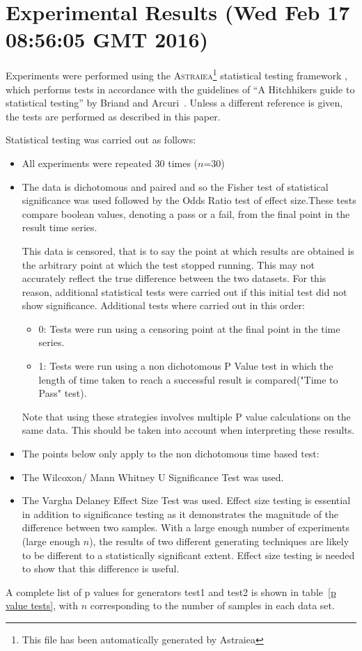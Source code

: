 \documentclass[]{article}
\begin{document}
\section{Experimental Results (Wed Feb 17 08:56:05 GMT 2016)}
Experiments were performed using the \textsc{Astraiea}\footnote{This file has been automatically generated by Astraiea} statistical testing framework \cite{Neumann:2014:EET:2598394.2609850},
which performs tests in accordance with the guidelines of ``A Hitchhikers guide to statistical testing''
by Briand and Arcuri~\cite{Arcuri2012}.
Unless a different reference is given, the tests are performed as described in this paper.



Statistical testing was carried out as follows: 
\begin{itemize}
\item{All experiments were repeated 30 times ($n$=30)}
\item{The data is dichotomous and paired and so the Fisher test of statistical significance was used followed by the Odds Ratio test of effect size.These tests compare boolean values, denoting a pass or a fail, from the final point in the result time series. 

This data is censored, that is to say the point at which results are obtained is the arbitrary point at which the test stopped running. This may not accurately reflect the true difference between the two datasets. For this reason, additional statistical tests were carried out if this initial test did not show significance. Additional tests where carried out in this order:
\begin{itemize}
\item{0: Tests were run using a censoring point at the final point in the time series.}
\item{1: Tests were run using a non dichotomous P Value test in which the length of time taken to reach a successful result is compared("Time to Pass" test).}
\end{itemize}Note that using these strategies involves multiple P value calculations on the same data. This should be taken into account when interpreting these results.
}
\item{The points below only apply to the non dichotomous time based test:}
\item{The Wilcoxon/ Mann Whitney U Significance Test was used.}
\item{The Vargha Delaney Effect Size Test was used. Effect size testing is essential in addition to significance testing as it demonstrates the magnitude of the difference between two samples. With a large enough number of experiments (large enough $n$), the results of two different generating techniques are likely to be different to a statistically significant extent. Effect size testing is needed to show that this difference is useful.}
\end{itemize}A complete list of p values for generators test1 and test2 is shown in table~\ref{p value tests}, with $n$ corresponding to the number of samples in each data set.
\end{document}
